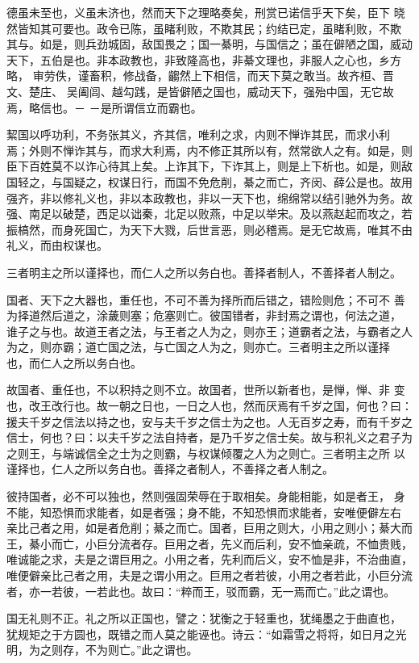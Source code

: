 \documentclass[]{article}
\begin{document}
德虽未至也，义虽未济也，然而天下之理略奏矣，刑赏已诺信乎天下矣，臣下
晓然皆知其可要也。政令已陈，虽睹利败，不欺其民；约结已定，虽睹利败，不欺
其与。如是，则兵劲城固，敌国畏之；国一綦明，与国信之；虽在僻陋之国，威动
天下，五伯是也。非本政教也，非致隆高也，非綦文理也，非服人之心也，乡方略，
审劳佚，谨畜积，修战备，齺然上下相信，而天下莫之敢当。故齐桓、晋文、楚庄、
吴阖闾、越勾践，是皆僻陋之国也，威动天下，强殆中国，无它故焉，略信也。－
－是所谓信立而霸也。

絜国以呼功利，不务张其义，齐其信，唯利之求，内则不惮诈其民，而求小利
焉；外则不惮诈其与，而求大利焉，内不修正其所以有，然常欲人之有。如是，则
臣下百姓莫不以诈心待其上矣。上诈其下，下诈其上，则是上下析也。如是，则敌
国轻之，与国疑之，权谋日行，而国不免危削，綦之而亡，齐闵、薛公是也。故用
强齐，非以修礼义也，非以本政教也，非以一天下也，绵绵常以结引驰外为务。故
强、南足以破楚，西足以诎秦，北足以败燕，中足以举宋。及以燕赵起而攻之，若
振槁然，而身死国亡，为天下大戮，后世言恶，则必稽焉。是无它故焉，唯其不由
礼义，而由权谋也。

三者明主之所以谨择也，而仁人之所以务白也。善择者制人，不善择者人制之。

国者、天下之大器也，重任也，不可不善为择所而后错之，错险则危；不可不
善为择道然后道之，涂薉则塞；危塞则亡。彼国错者，非封焉之谓也，何法之道，
谁子之与也。故道王者之法，与王者之人为之，则亦王；道霸者之法，与霸者之人
为之，则亦霸；道亡国之法，与亡国之人为之，则亦亡。三者明主之所以谨择
也，而仁人之所以务白也。

故国者、重任也，不以积持之则不立。故国者，世所以新者也，是惮，惮、非
变也，改王改行也。故一朝之日也，一日之人也，然而厌焉有千岁之国，何也？曰：
援夫千岁之信法以持之也，安与夫千岁之信士为之也。人无百岁之寿，而有千岁之
信士，何也？曰：以夫千岁之法自持者，是乃千岁之信士矣。故与积礼义之君子为
之则王，与端诚信全之士为之则霸，与权谋倾覆之人为之则亡。三者明主之所
以谨择也，仁人之所以务白也。善择之者制人，不善择之者人制之。

彼持国者，必不可以独也，然则强固荣辱在于取相矣。身能相能，如是者王，
身不能，知恐惧而求能者，如是者强；身不能，不知恐惧而求能者，安唯便僻左右
亲比己者之用，如是者危削；綦之而亡。国者，巨用之则大，小用之则小；綦大而
王，綦小而亡，小巨分流者存。巨用之者，先义而后利，安不恤亲疏，不恤贵贱，
唯诚能之求，夫是之谓巨用之。小用之者，先利而后义，安不恤是非，不治曲直，
唯便僻亲比己者之用，夫是之谓小用之。巨用之者若彼，小用之者若此，小巨分流
者，亦一若彼，一若此也。故曰：``粹而王，驳而霸，无一焉而亡。''此之谓也。

国无礼则不正。礼之所以正国也，譬之：犹衡之于轻重也，犹绳墨之于曲直也，
犹规矩之于方圆也，既错之而人莫之能诬也。诗云：``如霜雪之将将，如日月之光
明，为之则存，不为则亡。''此之谓也。
\end{document}
